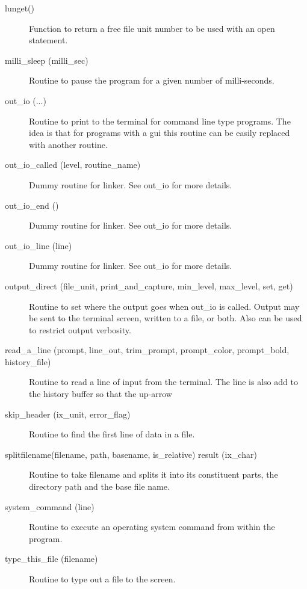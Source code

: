 \begin{description}
\label{r:lunget}
\item[lunget()] \Newline 
Function to return a free file unit number to be used with an open statement.

\label{r:milli.sleep}
\item[milli_sleep (milli_sec)] \Newline 
Routine to pause the program for a given number of milli-seconds.

\label{r:out.io}
\item[out_io (...)] \Newline 
Routine to print to the terminal for command line type programs.
The idea is that for programs with a gui this routine can be easily
replaced with another routine.

\label{r:out.io.called}
\item[out_io_called (level, routine_name)] \Newline 
Dummy routine for linker.
See out_io for more details.

\label{r:out.io.end}
\item[out_io_end ()] \Newline 
Dummy routine for linker.
See out_io for more details.

\label{r:out.io.line}
\item[out_io_line (line)] \Newline 
Dummy routine for linker.
See out_io for more details.

\label{r:output.direct}
\item[output_direct (file_unit, print_and_capture, min_level, max_level, set, get)] \Newline 
Routine to set where the output goes when out_io is called.
Output may be sent to the terminal screen, written to a file, or both.
Also can be used to restrict output verbosity.

\label{r:read.a.line}
\item[read_a_line (prompt, line_out, trim_prompt, prompt_color, prompt_bold, history_file)] \Newline 
Routine to read a line of input from the terminal.
The line is also add to the history buffer so that the up-arrow

\label{r:skip.header}
\item[skip_header (ix_unit, error_flag)] \Newline 
Routine to find the first line of data in a file. 

\label{r:splitfilename}
\item[splitfilename(filename, path, basename, is_relative) result (ix_char)] \Newline 
Routine to take filename and splits it into its constituent parts, 
the directory path and the base file name.  

\label{r:system.command}
\item[system_command (line)] \Newline 
Routine to execute an operating system command from within the program.

\label{r:type.this.file}
\item[type_this_file (filename)] \Newline 
Routine to type out a file to the screen.

\end{description}

